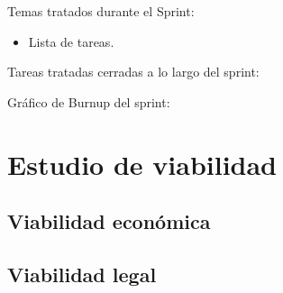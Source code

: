 Temas tratados durante el Sprint:
\begin{itemize}
	\item
	Lista de tareas.
\end{itemize}

Tareas tratadas cerradas a lo largo del sprint:

Gráfico de Burnup del sprint:

\section{Estudio de viabilidad}

\subsection{Viabilidad económica}

\subsection{Viabilidad legal}



